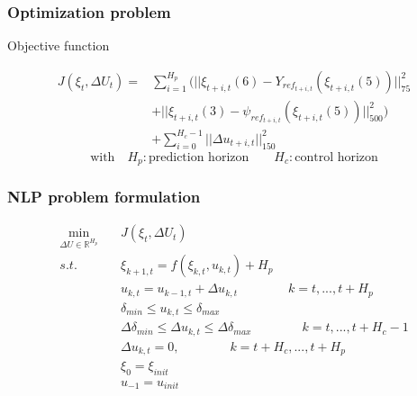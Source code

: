 \documentclass{beamer}
\begin{document}
\begin{frame}
\frametitle{Optimization problem}

\begin{block}{Objective function}


\begin{align*}
J(\xi_{t}, \Delta U_t) = &\sum_{i=1}^{H_p} ( ||\xi_{t+i,t}(6) -
Y_{ref_{t+i,t}}(\xi_{t+i,t}(5)) ||_{75}^2 \\ 
&+ ||\xi_{t+i,t}(3) -
\psi_{ref_{t+i,t}}(\xi_{t+i,t}(5)) ||_{500}^2 ) \\
&+ \sum_{i=0}^{H_c-1} || \Delta u_{t+i,t} ||_{150}^2
\end{align*}
\[\text{with} \quad H_p : \text{prediction horizon} \qquad H_c : \text{control
horizon}\]


\end{block}

\end{frame}







\begin{frame}
\frametitle{NLP problem formulation}

\begin{align*}
\min_{\Delta U \in \mathbb{R}^{H_p}} \quad &J(\xi_t, \Delta U_t) \\
s.t. \qquad &\xi_{k+1,t} = f(\xi_{k,t}, u_{k,t})
+ H_{p}
\\ &u_{k,t} = u_{k-1,t} + \Delta {u_{k,t}} \qquad \qquad k = t, . . . , t
+ H_{p}\\
&\delta_{min} \leq u_{k,t} \leq \delta_{max} \\
&\Delta \delta_{min} \leq \Delta u_{k,t} \leq \Delta \delta_{max} \qquad \qquad k = t, . . . , t + H_c
-1 \\
&\Delta u_{k,t} = 0, \qquad \qquad k = t + H_c, . . . , t + H_p \\
&\xi_0 = \xi_{init} \\
& u_{-1} = u_{init}
\end{align*}

\end{frame}
\end{document}
